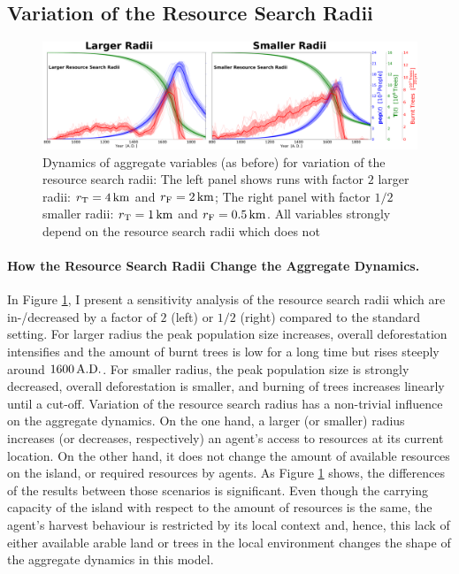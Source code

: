\subsection{Variation of the Resource Search Radii}
\begin{figure}
	\centering
	\includegraphics[width=1.3\linewidth, center]{images/Results/EnsembleStatistics_largersmallerRad}
	\caption{Dynamics of aggregate variables (as before) for variation of the resource search radii: The left panel shows runs with factor $2$ larger radii: $r_{\rm T}=4\, {\rm km}$ and $r_{\rm F}=2\, {\rm km}$; The right panel with factor $1/2$ smaller radii: $r_{\rm T}=1\, {\rm km}$ and $r_{\rm F}=0.5\, {\rm km}$. All variables strongly depend on the resource search radii which does not}
	\label{fig:ensemblestatisticslargersmallerrad}
\end{figure}

\paragraph{How the Resource Search Radii Change the Aggregate Dynamics.}
In Figure \ref{fig:ensemblestatisticslargersmallerrad}, I present a sensitivity analysis of the resource search radii which are in-/decreased by a factor of $2$ (left) or  $1/2$ (right) compared to the standard setting. 
For larger radius the peak population size increases, overall deforestation intensifies and the amount of burnt trees is low for a long time but rises steeply around $1600\, {\rm A.D.}$.
For smaller radius, the peak population size is strongly decreased, overall deforestation is smaller, and burning of trees increases linearly until a cut-off.
Variation of the resource search radius has a non-trivial influence on the aggregate dynamics.
On the one hand, a larger (or smaller) radius increases (or decreases, respectively) an agent's access to resources at its current location. 
On the other hand, it does not change the amount of available resources on the island, or required resources by agents.
As Figure \ref{fig:ensemblestatisticslargersmallerrad} shows, the differences of the results between those scenarios is significant. 
Even though the carrying capacity of the island with respect to the amount of resources is the same, the agent's harvest behaviour is restricted by its local context and, hence, this lack of either available arable land or trees in the local environment changes the shape of the aggregate dynamics in this model.

